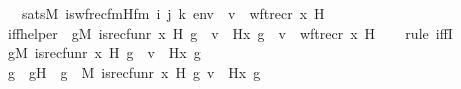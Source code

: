 \begin{isabellebody}
\ \ \ {\isachardoublequoteopen}sats{\isacharparenleft}{\kern0pt}M{\isacharcomma}{\kern0pt}\ is{\isacharunderscore}{\kern0pt}wfrec{\isacharunderscore}{\kern0pt}fm{\isacharparenleft}{\kern0pt}Hfm{\isacharcomma}{\kern0pt}\ i{\isacharcomma}{\kern0pt}\ j{\isacharcomma}{\kern0pt}\ k{\isacharparenright}{\kern0pt}{\isacharcomma}{\kern0pt}\ env{\isacharparenright}{\kern0pt}\ {\isasymlongleftrightarrow}\ v\ {\isacharequal}{\kern0pt}\ wftrec{\isacharparenleft}{\kern0pt}r{\isacharcomma}{\kern0pt}\ x{\isacharcomma}{\kern0pt}\ H{\isacharparenright}{\kern0pt}{\isachardoublequoteclose}\ \ \isanewline
%
\isadelimproof
%
\endisadelimproof
%
\isatagproof
{}\isamarkupfalse%
\ {\isacharminus}{\kern0pt}\isanewline
\ \ \isamarkupfalse%
\ iff{\isacharunderscore}{\kern0pt}helper\ {\isacharcolon}{\kern0pt}\ {\isachardoublequoteopen}{\isacharparenleft}{\kern0pt}{\isasymexists}g{\isacharbrackleft}{\kern0pt}{\isacharhash}{\kern0pt}{\isacharhash}{\kern0pt}M{\isacharbrackright}{\kern0pt}{\isachardot}{\kern0pt}\ is{\isacharunderscore}{\kern0pt}recfun{\isacharparenleft}{\kern0pt}r{\isacharcomma}{\kern0pt}\ x{\isacharcomma}{\kern0pt}\ H{\isacharcomma}{\kern0pt}\ g{\isacharparenright}{\kern0pt}\ {\isasymand}\ v\ {\isacharequal}{\kern0pt}\ H{\isacharparenleft}{\kern0pt}x{\isacharcomma}{\kern0pt}\ g{\isacharparenright}{\kern0pt}{\isacharparenright}{\kern0pt}\ {\isasymlongleftrightarrow}\ v\ {\isacharequal}{\kern0pt}\ wftrec{\isacharparenleft}{\kern0pt}r{\isacharcomma}{\kern0pt}\ x{\isacharcomma}{\kern0pt}\ H{\isacharparenright}{\kern0pt}{\isachardoublequoteclose}\isanewline
\ \ \isamarkupfalse%
\ {\isacharparenleft}{\kern0pt}rule\ iffI{\isacharparenright}{\kern0pt}\isanewline
\ \ \ \ \isamarkupfalse%
\ {\isachardoublequoteopen}{\isasymexists}g{\isacharbrackleft}{\kern0pt}{\isacharhash}{\kern0pt}{\isacharhash}{\kern0pt}M{\isacharbrackright}{\kern0pt}{\isachardot}{\kern0pt}\ is{\isacharunderscore}{\kern0pt}recfun{\isacharparenleft}{\kern0pt}r{\isacharcomma}{\kern0pt}\ x{\isacharcomma}{\kern0pt}\ H{\isacharcomma}{\kern0pt}\ g{\isacharparenright}{\kern0pt}\ {\isasymand}\ v\ {\isacharequal}{\kern0pt}\ H{\isacharparenleft}{\kern0pt}x{\isacharcomma}{\kern0pt}\ g{\isacharparenright}{\kern0pt}{\isachardoublequoteclose}\ \isanewline
\ \ \ \ \isamarkupfalse%
\ \isamarkupfalse%
\ g\ \ gH\ {\isacharcolon}{\kern0pt}\ {\isachardoublequoteopen}g\ {\isasymin}\ M{\isachardoublequoteclose}\ {\isachardoublequoteopen}is{\isacharunderscore}{\kern0pt}recfun{\isacharparenleft}{\kern0pt}r{\isacharcomma}{\kern0pt}\ x{\isacharcomma}{\kern0pt}\ H{\isacharcomma}{\kern0pt}\ g{\isacharparenright}{\kern0pt}{\isachardoublequoteclose}\ {\isachardoublequoteopen}v\ {\isacharequal}{\kern0pt}\ H{\isacharparenleft}{\kern0pt}x{\isacharcomma}{\kern0pt}\ g{\isacharparenright}{\kern0pt}{\isachardoublequoteclose}\ \isamarkupfalse%

\end{isabellebody}
